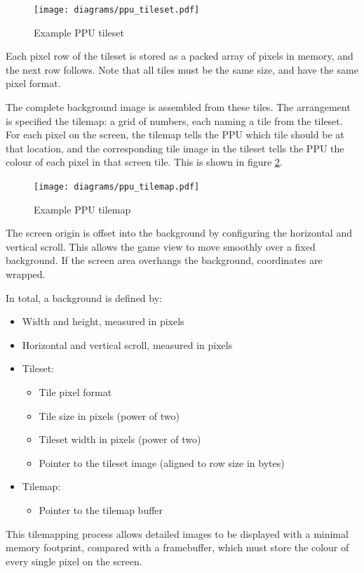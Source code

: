 \begin{figure}[H]
\centering
\caption{Example PPU tileset}
\label{diagram:ppu_tileset}
\texttt{[image: diagrams/ppu\_tileset.pdf]}
\end{figure}

Each pixel row of the tileset is stored as a packed array of pixels in memory, and the next row follows. Note that all tiles must be the same size, and have the same pixel format.

The complete background image is assembled from these tiles. The arrangement is specified the tilemap: a grid of numbers, each naming a tile from the tileset. For each pixel on the screen, the tilemap tells the PPU which tile should be at that location, and the corresponding tile image in the tileset tells the PPU the colour of each pixel in that screen tile. This is shown in figure \ref{diagram:ppu_tilemap}.

\begin{figure}[H]
\centering
\caption{Example PPU tilemap}
\label{diagram:ppu_tilemap}
\texttt{[image: diagrams/ppu\_tilemap.pdf]}
\end{figure}

The screen origin is offset into the background by configuring the horizontal and vertical scroll. This allows the game view to move smoothly over a fixed background. If the screen area overhangs the background, coordinates are wrapped.

In total, a background is defined by:

\begin{itemize}
	\item Width and height, measured in pixels
	\item Horizontal and vertical scroll, measured in pixels
	\item Tileset:
	\begin{itemize}
		\item Tile pixel format
		\item Tile size in pixels (power of two)
		\item Tileset width in pixels (power of two)
		\item Pointer to the tileset image (aligned to row size in bytes)
	\end{itemize}
	\item Tilemap:
	\begin{itemize}
		\item Pointer to the tilemap buffer
	\end{itemize}
\end{itemize}

This tilemapping process allows detailed images to be displayed with a minimal memory footprint, compared with a framebuffer, which must store the colour of every single pixel on the screen.
